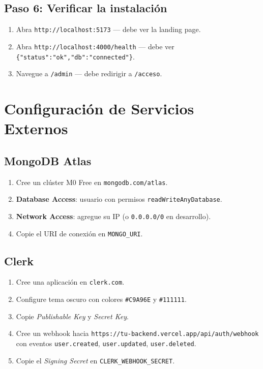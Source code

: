 \documentclass[12pt, a4paper, twoside]{report}
\begin{document}
\subsection*{Paso 6: Verificar la instalación}

\begin{enumerate}
  \item Abra \texttt{http://localhost:5173} --- debe ver la landing page.
  \item Abra \texttt{http://localhost:4000/health} --- debe ver
        \texttt{\{"status":"ok","db":"connected"\}}.
  \item Navegue a \texttt{/admin} --- debe redirigir a \texttt{/acceso}.
\end{enumerate}

\section{Configuración de Servicios Externos}

\subsection*{MongoDB Atlas}
\begin{enumerate}
  \item Cree un clúster M0 Free en \texttt{mongodb.com/atlas}.
  \item \textbf{Database Access}: usuario con permisos \texttt{readWriteAnyDatabase}.
  \item \textbf{Network Access}: agregue su IP (o \texttt{0.0.0.0/0} en desarrollo).
  \item Copie el URI de conexión en \texttt{MONGO\_URI}.
\end{enumerate}

\subsection*{Clerk}
\begin{enumerate}
  \item Cree una aplicación en \texttt{clerk.com}.
  \item Configure tema oscuro con colores \texttt{\#C9A96E} y \texttt{\#111111}.
  \item Copie \textit{Publishable Key} y \textit{Secret Key}.
  \item Cree un webhook hacia \texttt{https://tu-backend.vercel.app/api/auth/webhook}
        con eventos \texttt{user.created}, \texttt{user.updated}, \texttt{user.deleted}.
  \item Copie el \textit{Signing Secret} en \texttt{CLERK\_WEBHOOK\_SECRET}.
\end{enumerate}
\end{document}
